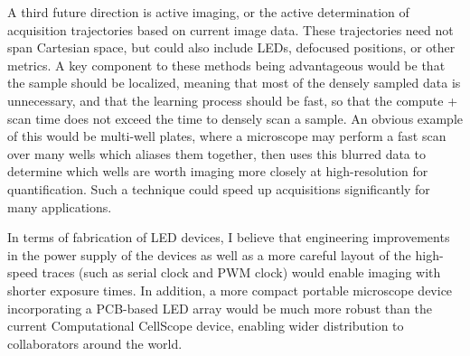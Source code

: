 A third future direction is active imaging, or the active determination of acquisition trajectories based on current image data. These trajectories need not span Cartesian space, but could also include LEDs, defocused positions, or other metrics. A key component to these methods being advantageous would be that the sample should be localized, meaning that most of the densely sampled data is unnecessary, and that the learning process should be fast, so that the compute + scan time does not exceed the time to densely scan a sample. An obvious example of this would be multi-well plates, where a microscope may perform a fast scan over many wells which aliases them together, then uses this blurred data to determine which wells are worth imaging more closely at high-resolution for quantification. Such a technique could speed up acquisitions significantly for many applications.

In terms of fabrication of LED devices, I believe that engineering improvements in the power supply of the devices as well as a more careful layout of the high-speed traces (such as serial clock and PWM clock) would enable imaging with shorter exposure times. In addition, a more compact portable microscope device incorporating a PCB-based LED array would be much more robust than the current Computational CellScope device, enabling wider distribution to collaborators around the world.